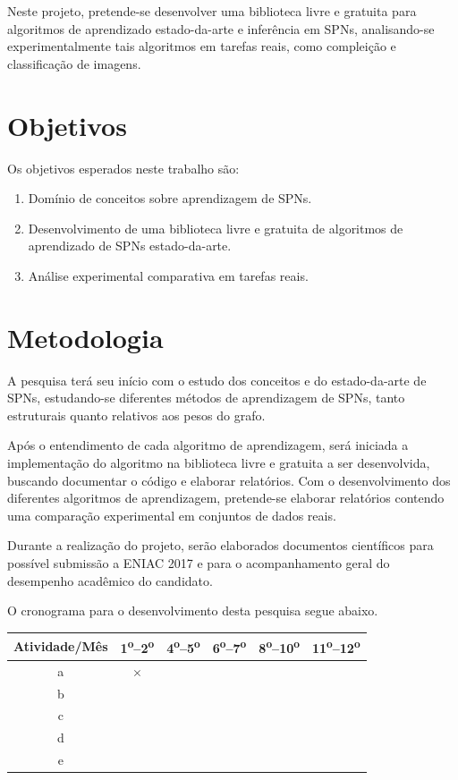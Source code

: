 \documentclass[12pt]{article}
\newcommand{\tsup}{\textsuperscript}
\theoremstyle{plain}
\numberwithin{equation}{section}
\begin{document}
Neste projeto, pretende-se desenvolver uma biblioteca livre e gratuita para algoritmos de
aprendizado estado-da-arte e inferência em SPNs, analisando-se experimentalmente tais algoritmos em
tarefas reais, como compleição e classificação de imagens.
\newpage

\section{Objetivos}

Os objetivos esperados neste trabalho são:

\begin{enumerate}
  \item Domínio de conceitos sobre aprendizagem de SPNs.
  \item Desenvolvimento de uma biblioteca livre e gratuita de algoritmos de aprendizado de SPNs
    estado-da-arte.
  \item Análise experimental comparativa em tarefas reais.
\end{enumerate}

\section{Metodologia}

A pesquisa terá seu início com o estudo dos conceitos e do estado-da-arte de SPNs, estudando-se
diferentes métodos de aprendizagem de SPNs, tanto estruturais quanto relativos aos pesos do grafo.

Após o entendimento de cada algoritmo de aprendizagem, será iniciada a implementação do algoritmo
na biblioteca livre e gratuita a ser desenvolvida, buscando documentar o código e elaborar
relatórios. Com o desenvolvimento dos diferentes algoritmos de aprendizagem, pretende-se elaborar
relatórios contendo uma comparação experimental em conjuntos de dados reais.

Durante a realização do projeto, serão elaborados documentos científicos para possível submissão a
ENIAC 2017 e para o acompanhamento geral do desempenho acadêmico do candidato.

O cronograma para o desenvolvimento desta pesquisa segue abaixo.


\begin{table}[h]
  \centering
  \begin{tabular}{|c|c|c|c|c|c|}
    \hline
    Atividade/Mês & 1\tsup{o}--2\tsup{o} & 4\tsup{o}--5\tsup{o} & 6\tsup{o}--7\tsup{o} &
    8\tsup{o}--10\tsup{o} & 11\tsup{o}--12\tsup{o} \\ \hline
    a & $\times$ & & & & \\ \hline
    b & & & & & \\ \hline
    c & & & & & \\ \hline
    d & & & & & \\ \hline
    e & & & & & \\
    \hline
  \end{tabular}
\end{table}


\printbibliography[]
\end{document}
